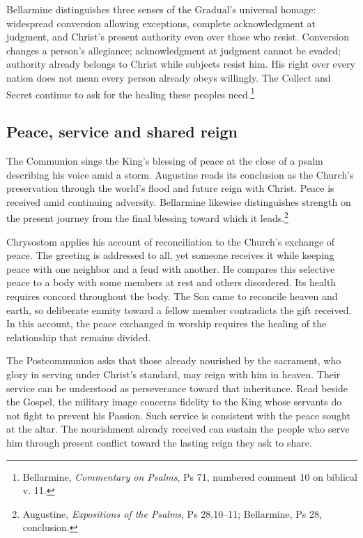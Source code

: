 Bellarmine distinguishes three senses of the Gradual's universal homage: widespread conversion allowing exceptions, complete acknowledgment at judgment, and Christ's present authority even over those who resist. Conversion changes a person's allegiance; acknowledgment at judgment cannot be evaded; authority already belongs to Christ while subjects resist him. His right over every nation does not mean every person already obeys willingly. The Collect and Secret continue to ask for the healing these peoples need.\footnote{Bellarmine, \emph{Commentary on Psalms}, Ps 71, numbered comment 10 on biblical v. 11.}

\subsection{Peace, service and shared reign}
The Communion sings the King's blessing of peace at the close of a psalm describing his voice amid a storm. Augustine reads its conclusion as the Church's preservation through the world's flood and future reign with Christ. Peace is received amid continuing adversity. Bellarmine likewise distinguishes strength on the present journey from the final blessing toward which it leads.\footnote{Augustine, \emph{Expositions of the Psalms}, Ps 28.10--11; Bellarmine, Ps 28, conclusion.}

Chrysostom applies his account of reconciliation to the Church's exchange of peace. The greeting is addressed to all, yet someone receives it while keeping peace with one neighbor and a feud with another. He compares this selective peace to a body with some members at rest and others disordered. Its health requires concord throughout the body. The Son came to reconcile heaven and earth, so deliberate enmity toward a fellow member contradicts the gift received. In this account, the peace exchanged in worship requires the healing of the relationship that remains divided.

The Postcommunion asks that those already nourished by the sacrament, who glory in serving under Christ's standard, may reign with him in heaven. Their service can be understood as perseverance toward that inheritance. Read beside the Gospel, the military image concerns fidelity to the King whose servants do not fight to prevent his Passion. Such service is consistent with the peace sought at the altar. The nourishment already received can sustain the people who serve him through present conflict toward the lasting reign they ask to share.
